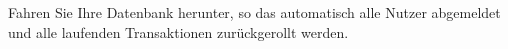       \item Fahren Sie Ihre Datenbank herunter, so das automatisch alle Nutzer abgemeldet und alle laufenden Transaktionen zur\"uckgerollt werden.
